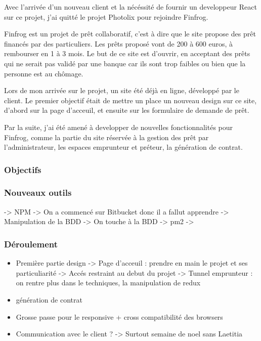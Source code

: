 \documentclass[12pt,a4paper]{article}
\begin{document}
  \bigskip

  Avec l'arrivée d'un nouveau client et la nécéssité de fournir un
  developpeur React sur ce projet, j'ai quitté le projet Photolix pour
  rejoindre Finfrog.

  \bigskip

  Finfrog est un projet de prêt collaboratif, c'est à dire que le site
  propose des prêt financés par des particuliers. Les prêts proposé vont
  de 200 à 600 euros, à rembourser en 1 à 3 mois. Le but de ce site est
  d'ouvrir, en acceptant des prêts qui ne serait pas validé par une banque
  car ils sont trop faibles ou bien que la personne est au chômage.

  \bigskip

  Lors de mon arrivée sur le projet, un site été déjà en ligne, développé
  par le client. Le premier objectif était de mettre un place un nouveau
  design sur ce site, d'abord sur la page d'acceuil, et ensuite sur les
  formulaire de demande de prêt.

  \bigskip

  Par la suite, j'ai été amené à developper de nouvelles fonctionnalités
  pour Finfrog, comme la partie du site réservée à la gestion des prêt par
  l'administrateur, les espaces emprunteur et préteur, la génération de
  contrat.

  \subsubsection{Objectifs}\label{objectifs-1}

  \subsubsection{Nouveaux outils}\label{nouveaux-outils}

  -\textgreater{} NPM -\textgreater{} On a commencé sur Bitbucket donc il
  a fallut apprendre -\textgreater{} Manipulation de la BDD
  -\textgreater{} On touche à la BDD -\textgreater{} pm2 -\textgreater{}

  \subsubsection{Déroulement}\label{duxe9roulement-1}

  \begin{itemize}
  \item
    Première partie design -\textgreater{} Page d'acceuil : prendre en
    main le projet et ses particuliarité -\textgreater{} Accés restraint
    au debut du projet -\textgreater{} Tunnel emprunteur : on rentre plus
    dans le techniques, la manipulation de redux
  \item
    génération de contrat
  \item
    Grosse passe pour le responsive + cross compatibilité des browsers
  \item
    Communication avec le client ? -\textgreater{} Surtout semaine de noel
    sans Laetitia
  \end{itemize}
\end{document}
